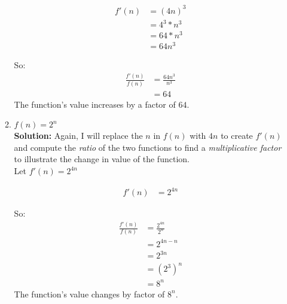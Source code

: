 \documentclass[11pts]{article}
\begin{document}
\begin{enumerate}
\begin{enumerate}
    \begin{align*}
    f'(n) &= (4n)^{3}            \\
          &= 4^{3} * n^{3}       \\
          &= 64 * n^{3}          \\
          &= 64n^{3}
    \end{align*}

    So: 
    \begin{align*}
    \frac{f'(n)}{f(n)} &= \frac{64n^{3}}{n^{3}} \\
                       &= 64
    \end{align*}
    The function's value increases by a factor of $64$. \\

    \item $ f(n)=2^{n} $ \\

    \textbf{Solution:} Again, I will replace the $n$ in $f(n)$ with
    $4n$ to create $f'(n)$ and compute the \emph{ratio} of the two
    functions to find a \emph{multiplicative factor} to illustrate
    the change in value of the function.\\
    Let $f'(n) = 2^{4n}$

    \begin{align*}
    f'(n) &= 2^{4n}
    \end{align*}

    So: 
    \begin{align*}
    \frac{f'(n)}{f(n)} &= \frac{2^{4n}}{2^{n}} \\
                 &= 2^{4n-n}                   \\
                 &= 2^{3n}                     \\
                 &= (2^{3})^{n}                \\
                 &= 8^{n}
    \end{align*}
    The function's value changes by  factor of $ 8^{n} $. \\

    \end{enumerate}

\end{enumerate}
\end{document}
